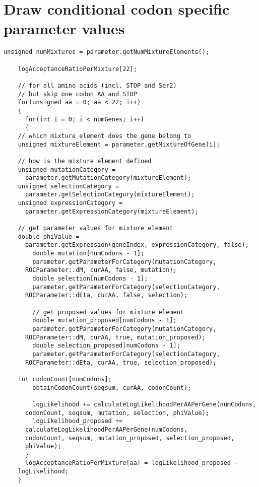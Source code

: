 \documentclass[11pt]{article}
\begin{document}
  \section{Draw conditional codon specific parameter values}
   \begin{lstlisting}[frame=single]
    unsigned numMixtures = parameter.getNumMixtureElements();
    
    logAcceptanceRatioPerMixture[22];
    
    // for all amino acids (incl. STOP and Ser2) 
    // but skip one codon AA and STOP
    for(unsigned aa = 0; aa < 22; i++)
    {
      for(int i = 0; i < numGenes; i++)
      {
	// which mixture element does the gene belong to
	unsigned mixtureElement = parameter.getMixtureOfGene(i);
	
	// how is the mixture element defined
	unsigned mutationCategory = 
	  parameter.getMutationCategory(mixtureElement);
	unsigned selectionCategory = 
	  parameter.getSelectionCategory(mixtureElement);
	unsigned expressionCategory = 
	  parameter.getExpressionCategory(mixtureElement);
	
	// get parameter values for mixture element
	double phiValue = 
	  parameter.getExpression(geneIndex, expressionCategory, false);
        double mutation[numCodons - 1];
        parameter.getParameterForCategory(mutationCategory, 
	  ROCParameter::dM, curAA, false, mutation);
        double selection[numCodons - 1];
        parameter.getParameterForCategory(selectionCategory, 
	  ROCParameter::dEta, curAA, false, selection);
        
        // get proposed values for mixture element
        double mutation_proposed[numCodons - 1];
        parameter.getParameterForCategory(mutationCategory, 
	  ROCParameter::dM, curAA, true, mutation_proposed);
        double selection_proposed[numCodons - 1];
        parameter.getParameterForCategory(selectionCategory, 
	  ROCParameter::dEta, curAA, true, selection_proposed);        
	
	int codonCount[numCodons];
        obtainCodonCount(seqsum, curAA, codonCount);
	
        logLikelihood += calculateLogLikelihoodPerAAPerGene(numCodons, 
	  codonCount, seqsum, mutation, selection, phiValue);
        logLikelihood_proposed += 
	  calculateLogLikelihoodPerAAPerGene(numCodons, 
	  codonCount, seqsum, mutation_proposed, selection_proposed, 
	  phiValue);
      }
      logAcceptanceRatioPerMixture[aa] = logLikelihood_proposed - 
	logLikelihood;          
    }
   \end{lstlisting}
 
\end{document}
